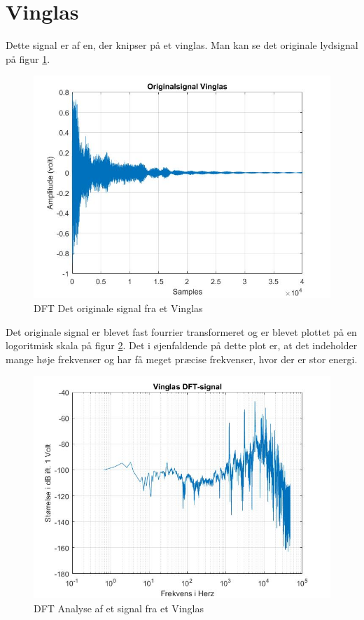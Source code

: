 \section{Vinglas}
Dette signal er af en, der knipser på et vinglas. Man kan se det originale lydsignal på figur \ref{fig:Vinglas original}.
\begin{figure}[H]
	\centering
	\includegraphics[width=140mm]{figures/Vinglas/original.jpg}
	\caption{DFT Det originale signal fra et Vinglas}
	\label{fig:Vinglas original}
\end{figure}

Det originale signal er blevet fast fourrier transformeret og er blevet plottet på en logoritmisk skala på figur \ref{fig:Vinglas DFT}. Det i øjenfaldende på dette plot er, at det indeholder mange høje frekvenser og har få meget præcise frekvenser, hvor der er stor energi.

\begin{figure}[H]
	\centering
	\includegraphics[width=120mm]{figures/Vinglas/DFT.jpg}
	\caption{DFT Analyse af et signal fra et Vinglas}
	\label{fig:Vinglas DFT}
\end{figure}

